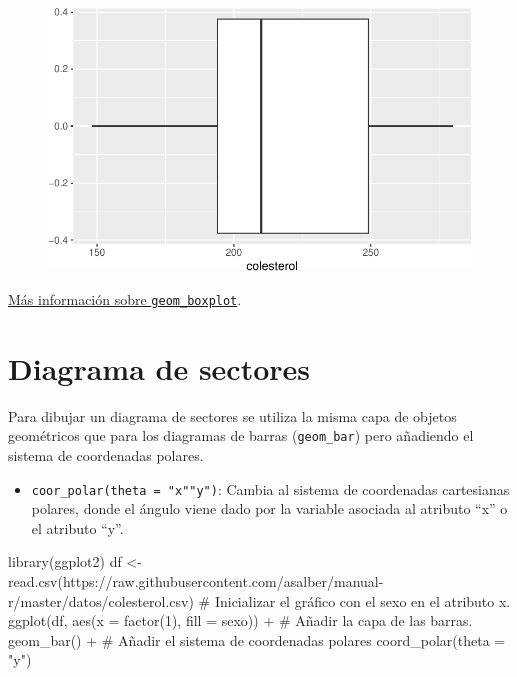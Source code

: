 \documentclass[
  a4paper,
]{scrreport}
\newenvironment{Shaded}{\begin{snugshade}}{\end{snugshade}}
\newcommand{\AttributeTok}[1]{\textcolor[rgb]{0.40,0.45,0.13}{#1}}
\newcommand{\CommentTok}[1]{\textcolor[rgb]{0.37,0.37,0.37}{#1}}
\newcommand{\DecValTok}[1]{\textcolor[rgb]{0.68,0.00,0.00}{#1}}
\newcommand{\FunctionTok}[1]{\textcolor[rgb]{0.28,0.35,0.67}{#1}}
\newcommand{\NormalTok}[1]{\textcolor[rgb]{0.00,0.23,0.31}{#1}}
\newcommand{\OtherTok}[1]{\textcolor[rgb]{0.00,0.23,0.31}{#1}}
\newcommand{\SpecialCharTok}[1]{\textcolor[rgb]{0.37,0.37,0.37}{#1}}
\newcommand{\StringTok}[1]{\textcolor[rgb]{0.13,0.47,0.30}{#1}}
\providecommand{\tightlist}{%
  \setlength{\itemsep}{0pt}\setlength{\parskip}{0pt}}\usepackage{longtable,booktabs,array}
\theoremstyle{definition}
\theoremstyle{definition}
\theoremstyle{remark}
\begin{document}
\begin{figure}[H]

{\centering \includegraphics{./07-graficos_files/figure-pdf/unnamed-chunk-21-1.pdf}

}

\end{figure}

\href{https://ggplot2.tidyverse.org/reference/geom_boxplot.html}{Más
información sobre \texttt{geom\_boxplot}}.

\hypertarget{diagrama-de-sectores}{%
\section{Diagrama de sectores}\label{diagrama-de-sectores}}

Para dibujar un diagrama de sectores se utiliza la misma capa de objetos
geométricos que para los diagramas de barras (\texttt{geom\_bar}) pero
añadiendo el sistema de coordenadas polares.

\begin{itemize}
\tightlist
\item
  \texttt{coor\_polar(theta\ =\ "x"\textbar{}"y")}: Cambia al sistema de
  coordenadas cartesianas polares, donde el ángulo viene dado por la
  variable asociada al atributo ``x'' o el atributo ``y''.
\end{itemize}

\begin{Shaded}
\begin{Highlighting}[]
\FunctionTok{library}\NormalTok{(ggplot2)}
\NormalTok{df }\OtherTok{\textless{}{-}} \FunctionTok{read.csv}\NormalTok{(}\StringTok{\textquotesingle{}https://raw.githubusercontent.com/asalber/manual{-}r/master/datos/colesterol.csv\textquotesingle{}}\NormalTok{)}
\CommentTok{\# Inicializar el gráfico con el sexo en el atributo x.}
\FunctionTok{ggplot}\NormalTok{(df, }\FunctionTok{aes}\NormalTok{(}\AttributeTok{x =} \FunctionTok{factor}\NormalTok{(}\DecValTok{1}\NormalTok{), }\AttributeTok{fill =}\NormalTok{ sexo)) }\SpecialCharTok{+}
\CommentTok{\# Añadir la capa de las barras.}
    \FunctionTok{geom\_bar}\NormalTok{() }\SpecialCharTok{+}
\CommentTok{\# Añadir el sistema de coordenadas polares}
    \FunctionTok{coord\_polar}\NormalTok{(}\AttributeTok{theta =} \StringTok{"y"}\NormalTok{)}
\end{Highlighting}
\end{Shaded}
\end{document}

